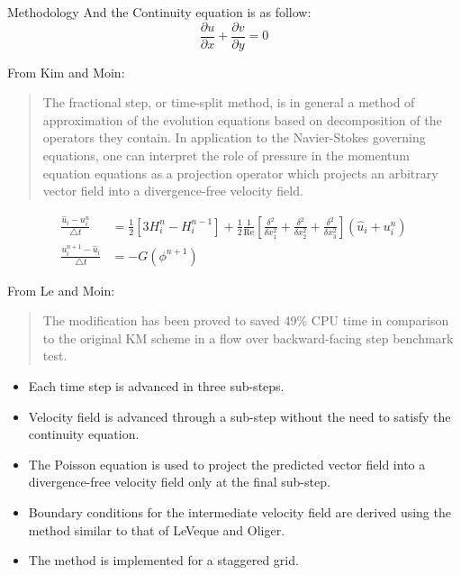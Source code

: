 \documentclass{beamer}
\newcommand{\timestep}{ \triangle t }
\newcommand{\ren}{ \text{Re} }
\begin{document}
\begin{frame}{Methodology}
	And the Continuity equation is as follow: \begin{equation}
		\frac{\partial u}{\partial x} + \frac{\partial v}{\partial y} = 0
	\end{equation}
	
	\framebreak
	
	From Kim and Moin:
	\begin{quote}
		The fractional step, or time-split method, is in general a method of approximation of the evolution equations based on decomposition of the operators they contain. In application to the Navier-Stokes governing equations, one can interpret the role of pressure in the momentum equation equations as a projection operator which projects an arbitrary vector field into a divergence-free velocity field.
	\end{quote}
	
	\begin{align}
		\frac{\hat{u}_i - u_i^n}{\timestep} &= \frac{1}{2} \left[3 H_i^n - H_i^{n-1}\right] + \frac{1}{2} \frac{1}{\ren} \left[ \frac{\delta^2}{\delta x_1^2} + \frac{\delta^2}{\delta x_2^2} + \frac{\delta^2}{\delta x_3^2} \right] (\hat{u}_i + u_i^n) \\
		\frac{u_i^{n+1} -\hat{u}_i}{\timestep} &= -G(\phi^{n+1})
	\end{align}
	
	\framebreak
	
	From Le and Moin:
	\begin{quote}
		The modification has been proved to saved 49\% CPU time in comparison to the original KM scheme in a flow over backward-facing step benchmark test.
	\end{quote}
	
	\begin{itemize}
		\item Each time step is advanced in three sub-steps.
		\item Velocity field is advanced through a sub-step without the need to satisfy the continuity equation.
		\item The Poisson equation is used to project the predicted vector field into a divergence-free velocity field only at the final sub-step.
		\item Boundary conditions for the intermediate velocity field are derived using the method similar to that of LeVeque and Oliger.
		\item The method is implemented for a staggered grid.
	\end{itemize}
	

\end{frame}
\end{document}

